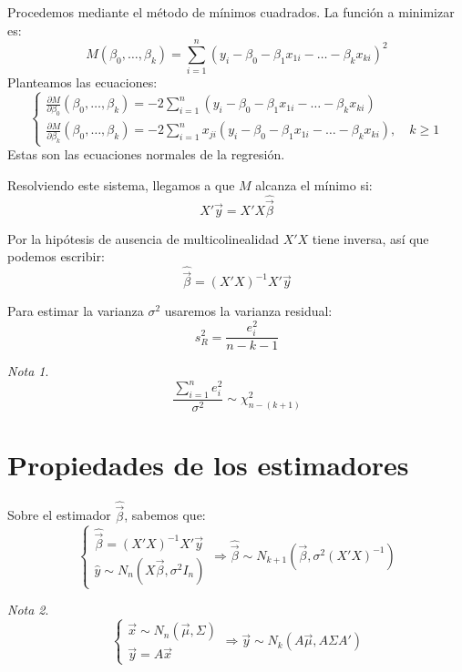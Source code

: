 \documentclass{report}
\theoremstyle{remark}
\theoremstyle{remark}
\newtheorem*{note}{Nota}
\theoremstyle{remark}
\theoremstyle{definition}
\theoremstyle{definition}
\theoremstyle{definition}
\begin{document}
Procedemos mediante el método de mínimos cuadrados.
La función a minimizar es:
$$M(\beta_0, \dots, \beta_k) = \sum_{i=1}^n (y_i - \beta_0 - \beta_1x_{1i} - \dots - \beta_kx_{ki})^2$$
Planteamos las ecuaciones:
$$\begin{cases}
        \frac{\partial M}{\partial \beta_0} (\beta_0, \dots, \beta_k) = -2\sum_{i=1}^n (y_i - \beta_0 - \beta_1x_{1i} - \dots - \beta_kx_{ki}) \\
        \frac{\partial M}{\partial \beta_k} (\beta_0, \dots, \beta_k) = -2\sum_{i=1}^n x_{ji}(y_i - \beta_0 - \beta_1x_{1i} - \dots - \beta_kx_{ki}), \quad k \geq 1
    \end{cases}$$
Estas son las ecuaciones normales de la regresión.

Resolviendo este sistema, llegamos a que $M$ alcanza el mínimo si:
$$X'\vec{y} = X'X\hat{\vec{\beta}}$$

Por la hipótesis de ausencia de multicolinealidad $X'X$ tiene inversa, así que podemos escribir:
$$\hat{\vec{\beta}} = (X'X)^{-1}X'\vec{y}$$

Para estimar la varianza $\sigma^2$ usaremos la varianza residual:
$$s_R^2 = \frac{e_i^2}{n-k-1}$$

\begin{note}
    $$\frac{\sum_{i=1}^n e_i^2}{\sigma^2} \sim \chi^2_{n-(k+1)}$$
\end{note}

\section{Propiedades de los estimadores}
Sobre el estimador $\hat{\vec{\beta}}$, sabemos que:
$$\begin{cases}
        \hat{\vec{\beta}} = (X'X)^{-1}X'\vec{y} \\
        \hat{y} \sim N_n(X\vec{\beta}, \sigma^2 I_n)
    \end{cases} \Rightarrow \hat{\vec{\beta}} \sim N_{k+1}(\vec{\beta}, \sigma^2(X'X)^{-1})$$

\begin{note}
    $$\begin{cases}
            \vec{x} \sim N_n(\vec{\mu}, \Sigma) \\
            \vec{y} = A\vec{x}
        \end{cases} \Rightarrow \vec{y} \sim N_k(A\vec{\mu}, A\Sigma A')$$
\end{note}
\end{document}
